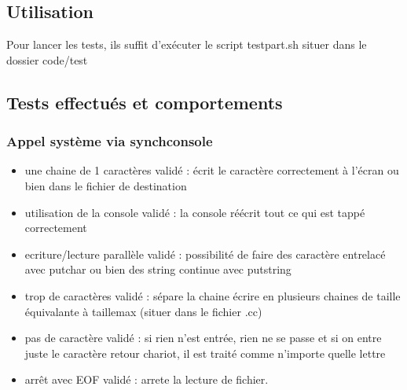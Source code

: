 \documentclass{article}
\begin{document}
	\subsection{Utilisation}
		{Pour lancer les tests, ils suffit d'exécuter le script testpart.sh situer dans le dossier code/test}

	\subsection{Tests effectués et comportements}
		\subsubsection{Appel système via synchconsole}
			\begin{itemize}
				\item une chaine de 1 caractères 			validé : écrit le caractère	correctement à l'écran ou bien dans le fichier de destination
				\item utilisation de la console				validé : la console réécrit tout ce qui est tappé correctement
				\item ecriture/lecture parallèle			validé : possibilité de faire des caractère entrelacé avec putchar ou bien des string continue avec putstring
				\item trop de caractères					validé : sépare la chaine écrire en plusieurs chaines de taille équivalante à taillemax (situer dans le fichier .cc)
				\item pas de caractère 						validé : si rien n'est entrée, rien ne se passe et si on entre juste le caractère retour chariot, il est traité comme n'importe quelle lettre
				\item arrêt avec EOF 						validé : arrete la lecture de fichier.
			\end{itemize}
\end{document}

